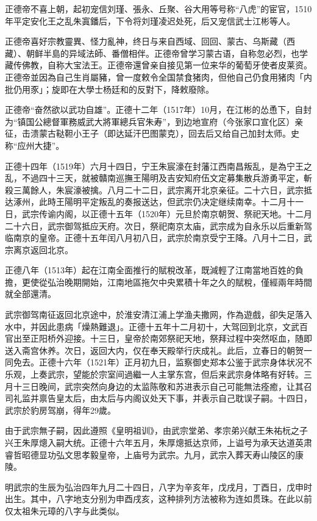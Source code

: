 正德帝不喜上朝，起初宠信刘瑾、張永、丘聚、谷大用等号称“八虎”的宦官，1510年平定安化王之乱朱寘鐇后，下令将刘瑾凌迟处死，后又宠信武士江彬等人。

正德帝喜好宗教靈異、怪力亂神，终日与来自西域、回回、蒙古、乌斯藏（西藏）、朝鲜半島的异域法師、番僧相伴。正德帝曾学习蒙古语，自称忽必烈，也学藏传佛教，自称大宝法王。正德帝還曾亲自接见第一位来华的葡萄牙使者皮莱资。正德帝並因為自己生肖屬豬，曾一度敕令全国禁食猪肉，但他自己仍食用猪肉「内批仍用豕」；旋即在大學士杨廷和的反對下，降敕廢除。

正德帝“奋然欲以武功自雄”。正德十二年（1517年）10月，在江彬的怂恿下，自封为“镇国公總督軍務威武大將軍總兵官朱寿”，到边地宣府（今张家口宣化区）亲征，击溃蒙古鞑靼小王子（即达延汗巴图蒙克），回去后又给自己加封太师。史称“应州大捷”。

正德十四年（1519年）六月十四日，宁王朱宸濠在封藩江西南昌叛乱，是為宁王之乱，不過四十三天，就被贛南巡撫王陽明及吉安知府伍文定募集散兵游勇平定，斬殺三萬餘人，朱宸濠被擒。八月二十二日，武宗离开北京亲征。二十六日，武宗抵达涿州，此時王陽明平定叛乱的奏报送达，但武宗仍决定继续南幸。十二月十一日，武宗传谕内阁，以正德十五年（1520年）元旦於南京朝贺、祭祀天地。十二月二十六日，武宗御驾抵应天府。次日，祭祀南京太庙，武宗成为自永乐以后重新驾临南京的皇帝。正德十五年闰八月初八日，武宗於南京受宁王降。八月十二日，武宗离京返回北京。

正德八年（1513年）起在江南全面推行的賦稅改革，既減輕了江南當地百姓的負擔，更使從弘治晚期開始，江南地區拖欠中央累積十年之久的賦稅，僅經兩年時間就全部還清。

武宗御驾南征返回北京途中，於淮安清江浦上学渔夫撒网，作為遊戲，卻失足落入水中，并因此患病「燥熱難退」。正德十五年十二月初十，大驾回到北京，文武百官出至正阳桥外迎接。十三日，皇帝於南郊祭祀天地，祭拜过程中突然呕血，随即送入斋宫休养。次日，返回大内，仅在奉天殿举行庆成礼。此后，立春日的朝贺一同免去。正德十六年（1521年）正月初九日，监察御史郑本公鉴于武宗身体状况不乐观，上奏武宗，望能於宗室间過繼一人主掌东宫，但后来武宗身体略有好转。三月十三日晚间，武宗突然向身边的太监陈敬和苏进表示自己可能無法痊癒，让其召司礼监并禀告皇太后，由太后与内阁议处天下事，并表示自己耽误子嗣。十四日，武宗於豹房驾崩，得年29歲。

由于武宗無子嗣，因此遵照《皇明祖训》，由武宗堂弟、孝宗弟兴献王朱祐杬之子兴王朱厚熜入嗣大统。正德十六年五月，朱厚熜抵达京师，上谥号为承天达道英肃睿哲昭德显功弘文思孝毅皇帝，上庙号为武宗。九月，武宗入葬天寿山陵区的康陵。

明武宗的生辰为弘治四年九月二十四日，八字为辛亥年，戊戌月，丁酉日，戊申时出生。其中，八字地支分别为申酉戌亥，这种排列方法被称为连如贯珠。在此以前仅太祖朱元璋的八字与此类似。

